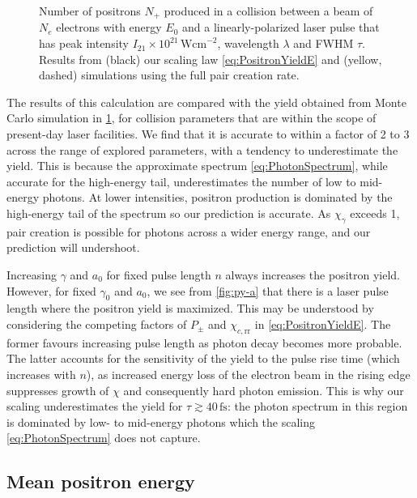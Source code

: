 \documentclass[reprint,superscriptaddress,amsmath,amssymb,aps,pra]{revtex4-1}
\newcommand{\Wcm}{\mathrm{Wcm}}
\newcommand{\fs}{\mathrm{fs}}
\newcommand{\chicrr}{\chi_{c,\mathrm{rr}}}
\begin{document}
	\begin{figure}
	\subfloat[]{}
	\caption[Positron yield]
			{Number of positrons $N_+$ produced in a collision between a beam of
			$N_e$ electrons with energy $E_0$ and a linearly-polarized laser pulse
			that has peak intensity $I_{21}\times10^{21}\,\Wcm^{-2}$,
			wavelength $\lambda$ and FWHM $\tau$.
			Results from (black) our scaling law \cref{eq:PositronYieldE}
			and (yellow, dashed) simulations using 
			the full pair creation rate.}
	\label{fig:PositronYield}
	\end{figure}
	
The results of this calculation are compared with
the yield obtained from Monte Carlo simulation in \cref{fig:PositronYield},
for collision parameters that are within the scope of present-day laser
facilities. We find that it is accurate to within a factor of 2 to 3 across
the range of explored parameters, with a tendency to underestimate the yield.
This is because the approximate spectrum \cref{eq:PhotonSpectrum}, while
accurate for the high-energy tail, underestimates the number of low to
mid-energy photons. At lower intensities, positron production is dominated
by the high-energy tail of the spectrum so our prediction is accurate. As $\chi_\gamma$
exceeds 1, pair creation is possible for photons across a wider energy
range, and our prediction will undershoot.

Increasing $\gamma$ and $a_0$ for fixed pulse length $n$
always increases the positron yield. However, for fixed $\gamma_0$ and $a_0$, we see from
\cref{fig:py-a} that there is a laser pulse length where the positron yield
is maximized. This may be understood by considering the competing factors
of $P_\pm$ and $\chicrr$ in \cref{eq:PositronYieldE}. The former
favours increasing pulse length as photon decay becomes more probable. The latter
accounts for the sensitivity of the yield to the pulse rise time (which increases
with $n$), as increased energy loss of the electron beam in the rising edge
suppresses growth of $\chi$ and consequently hard photon emission. This is
why our scaling underestimates the yield for $\tau \gtrsim 40\,\fs$: the
photon spectrum in this region is dominated by low- to mid-energy photons
which the scaling \cref{eq:PhotonSpectrum} does not capture.

\subsection{Mean positron energy}
\label{ssec:MeanPositronEnergy}
\end{document}
